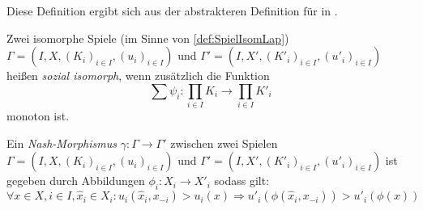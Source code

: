 \begin{bem}
	Diese Definition ergibt sich aus der abstrakteren Definition für  in \cite{LapGameCat}.
\end{bem}

\begin{defn}
	Zwei isomorphe Spiele (im Sinne von \cref{def:SpielIsomLap}) $\Gamma = (I, X, (K_i)_{i\in I}, (u_i)_{i\in I})$ und $\Gamma' = (I, X', (K'_i)_{i\in I}, (u'_i)_{i\in I})$ heißen \emph{sozial isomorph}, wenn zusätzlich die Funktion
		\[\sum \psi_i: \prod_{i \in I}K_i \to \prod_{i \in I} K'_i \]
	monoton ist. 
\end{defn}

\begin{defn}\label{def:NashMorphismus}
	Ein \emph{Nash-Morphismus} $\gamma: \Gamma \to \Gamma'$ zwischen zwei Spielen $\Gamma = (I, X, (K_i)_{i\in I}, (u_i)_{i\in I})$ und $\Gamma' = (I, X', (K'_i)_{i\in I}, (u'_i)_{i\in I})$ ist gegeben durch Abbildungen $\phi_i: X_i \to X'_i$ sodass gilt:
		\[\forall x\in X, i \in I, \hat{x}_i \in X_i: u_i(\hat{x}_i,x_{-i}) > u_i(x) \Rightarrow u'_i(\phi(\hat{x}_i,x_{-i})) > u'_i(\phi(x))\]
\end{defn}